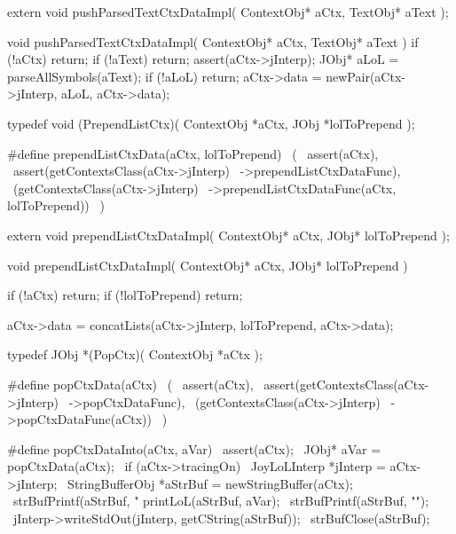 \startCHeader
extern void pushParsedTextCtxDataImpl(
  ContextObj* aCtx,
  TextObj* aText
);
\stopCHeader
{}

\startCCode
void pushParsedTextCtxDataImpl(
  ContextObj* aCtx,
  TextObj* aText
) {
  if (!aCtx) return;
  if (!aText) return;
  assert(aCtx->jInterp);
  JObj* aLoL = parseAllSymbols(aText);
  if (!aLoL) return;
  aCtx->data = newPair(aCtx->jInterp, aLoL, aCtx->data);
}
\stopCCode

\startCHeader
typedef void (PrependListCtx)(
  ContextObj *aCtx,
  JObj   *lolToPrepend
);

#define prependListCtxData(aCtx, lolToPrepend)      \
  (                                                 \
    assert(aCtx),                                   \
    assert(getContextsClass(aCtx->jInterp)          \
      ->prependListCtxDataFunc),                    \
    (getContextsClass(aCtx->jInterp)                \
      ->prependListCtxDataFunc(aCtx, lolToPrepend)) \
  )
\stopCHeader

\setCHeaderStream{private}
\startCHeader
extern void prependListCtxDataImpl(
  ContextObj* aCtx,
  JObj* lolToPrepend
);
\stopCHeader
\setCHeaderStream{public}

\startCCode
void prependListCtxDataImpl(
  ContextObj* aCtx,
  JObj* lolToPrepend
) {
  if (!aCtx) return;
  if (!lolToPrepend) return;

  aCtx->data =
    concatLists(aCtx->jInterp, lolToPrepend, aCtx->data);
}
\stopCCode

\startCHeader
typedef JObj *(PopCtx)(
  ContextObj *aCtx
);

#define popCtxData(aCtx)                    \
  (                                         \
    assert(aCtx),                           \
    assert(getContextsClass(aCtx->jInterp)  \
      ->popCtxDataFunc),                    \
    (getContextsClass(aCtx->jInterp)        \
      ->popCtxDataFunc(aCtx))               \
  )

#define popCtxDataInto(aCtx, aVar)                    \
assert(aCtx);                                         \
JObj* aVar = popCtxData(aCtx);                        \
if (aCtx->tracingOn) {                                \
  JoyLoLInterp *jInterp = aCtx->jInterp;              \
  StringBufferObj *aStrBuf = newStringBuffer(aCtx);   \
  strBufPrintf(aStrBuf, "%
  printLoL(aStrBuf, aVar);                            \
  strBufPrintf(aStrBuf, "\n");                        \
  jInterp->writeStdOut(jInterp, getCString(aStrBuf)); \
  strBufClose(aStrBuf);                               \
}

